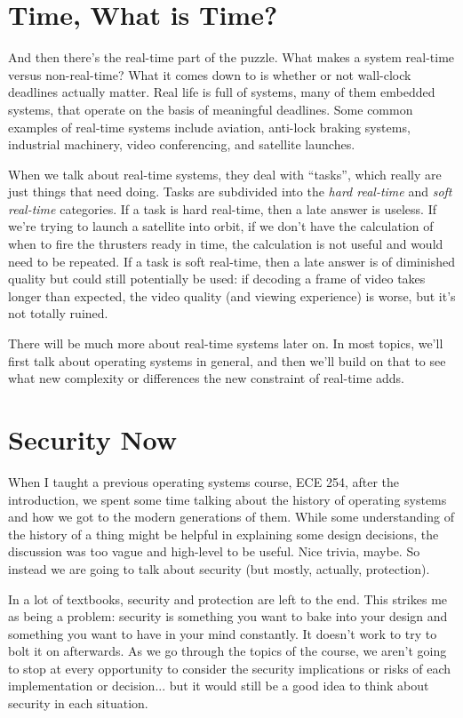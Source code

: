 \section*{Time, What is Time?}
And then there's the real-time part of the puzzle. What makes a system real-time versus non-real-time? What it comes down to is whether or not wall-clock deadlines actually matter. Real life is full of systems, many of them embedded systems, that operate on the basis of meaningful deadlines. Some common examples of real-time systems include aviation, anti-lock braking systems, industrial machinery, video conferencing, and satellite launches.

When we talk about real-time systems, they deal with ``tasks'', which really are just things that need doing. Tasks are subdivided into the \textit{hard real-time} and \textit{soft real-time} categories. If a task is hard real-time, then a late answer is useless. If we're trying to launch a satellite into orbit, if we don't have the calculation of when to fire the thrusters ready in time, the calculation is not useful and would need to be repeated. If a task is soft real-time, then a late answer is of diminished quality but could still potentially be used: if decoding a frame of video takes longer than expected, the video quality (and viewing experience) is worse, but it's not totally ruined.

There will be much more about real-time systems later on. In most topics, we'll first talk about operating systems in general, and then we'll build on that to see what new complexity or differences the new constraint of real-time adds. 

\section*{Security Now}
When I taught a previous operating systems course, ECE 254, after the introduction, we spent some time talking about the history of operating systems and how we got to the modern generations of them. While some understanding of the history of a thing might be helpful in explaining some design decisions, the discussion was too vague and high-level to be useful. Nice trivia, maybe. So instead we are going to talk about security (but mostly, actually, protection).

In a lot of textbooks, security and protection are left to the end. This strikes me as being a problem: security is something you want to bake into your design and something you want to have in your mind constantly. It doesn't work to try to bolt it on afterwards. As we go through the topics of the course, we aren't going to stop at every opportunity to consider the security implications or risks of each implementation or decision... but it would still be a good idea to think about security in each situation.

